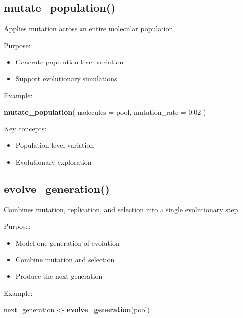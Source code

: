 \documentclass[
  oneside,
  openany]{book}
\newenvironment{Shaded}{\begin{snugshade}}{\end{snugshade}}
\newcommand{\AttributeTok}[1]{\textcolor[rgb]{0.13,0.29,0.53}{#1}}
\newcommand{\FloatTok}[1]{\textcolor[rgb]{0.00,0.00,0.81}{#1}}
\newcommand{\FunctionTok}[1]{\textcolor[rgb]{0.13,0.29,0.53}{\textbf{#1}}}
\newcommand{\NormalTok}[1]{#1}
\newcommand{\OtherTok}[1]{\textcolor[rgb]{0.56,0.35,0.01}{#1}}
\providecommand{\tightlist}{%
  \setlength{\itemsep}{0pt}\setlength{\parskip}{0pt}}
\begin{document}
\subsection{mutate\_population()}\label{mutate_population}

Applies mutation across an entire molecular population.

Purpose:

\begin{itemize}
\tightlist
\item
  Generate population-level variation
\item
  Support evolutionary simulations
\end{itemize}

Example:

\begin{Shaded}
\begin{Highlighting}[]
\FunctionTok{mutate\_population}\NormalTok{(}
  \AttributeTok{molecules =}\NormalTok{ pool,}
  \AttributeTok{mutation\_rate =} \FloatTok{0.02}
\NormalTok{)}
\end{Highlighting}
\end{Shaded}

Key concepts:

\begin{itemize}
\tightlist
\item
  Population-level variation
\item
  Evolutionary exploration
\end{itemize}

\subsection{evolve\_generation()}\label{evolve_generation}

Combines mutation, replication, and selection into a single evolutionary step.

Purpose:

\begin{itemize}
\tightlist
\item
  Model one generation of evolution
\item
  Combine mutation and selection
\item
  Produce the next generation
\end{itemize}

Example:

\begin{Shaded}
\begin{Highlighting}[]
\NormalTok{next\_generation }\OtherTok{\textless{}{-}} \FunctionTok{evolve\_generation}\NormalTok{(pool)}
\end{Highlighting}
\end{Shaded}
\end{document}
